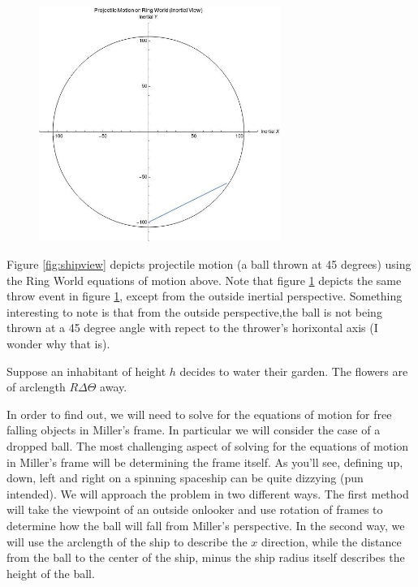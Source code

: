 \documentclass{amsart}
\theoremstyle{definition}
\begin{document}
\begin{figure}[h]
  \centering
  \includegraphics[width=0.7\textwidth]{InertialArclengthProjectileLabeled.jpg}
  \label{fig:inertialview}
  \caption{}
\end{figure}

Figure \ref{fig:shipview} depicts projectile motion (a ball thrown at
45 degrees) using the Ring World equations of motion above. Note that
figure \ref{fig:inertialview} depicts the same throw event in figure
\ref{fig:inertialview}, except from the outside inertial
perspective. Something interesting to note is that from the outside
perspective,the ball is not being thrown at a 45 degree angle with
repect to the thrower's horixontal axis (I wonder why that is).


Suppose an inhabitant of height $h$ decides to water their garden. The flowers are of arclength $R\Delta\Theta$ away. 

In order to find out, we will need to solve for the equations of
motion for free falling objects in Miller's frame. In particular we
will consider the case of a dropped ball. The most challenging aspect
of solving for the equations of motion in Miller's frame will be
determining the frame itself. As you'll see, defining up, down, left
and right on a spinning spaceship can be quite dizzying (pun
intended). We will approach the problem in two different ways. The
first method will take the viewpoint of an outside onlooker and use
rotation of frames to determine how the ball will fall from Miller's
perspective. In the second way, we will use the arclength of the ship
to describe the $x$ direction, while the distance from the ball to the
center of the ship, minus the ship radius itself describes the height
of the ball.
\end{document}
